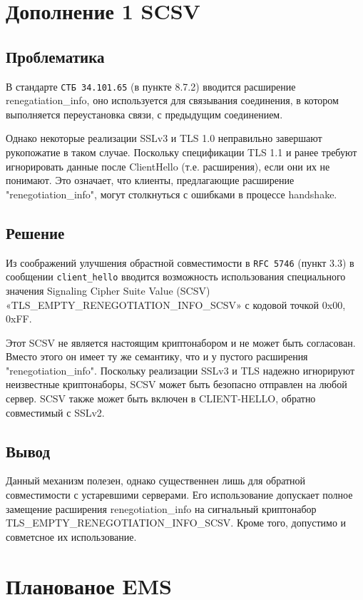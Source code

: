 \section{Дополнение 1 SCSV}
\subsection{Проблематика}
В стандарте \texttt{СТБ 34.101.65} (в пункте 8.7.2) вводится расширение renegatiation\_info, оно используется для связывания соединения, в котором выполняется переустановка связи, с предыдущим соединением.

 Однако некоторые реализации SSLv3 и TLS 1.0 неправильно завершают рукопожатие в таком случае. Поскольку спецификации TLS 1.1 и ранее требуют игнорировать данные после ClientHello (т.е. расширения), если они их не понимают. Это означает, что клиенты, предлагающие расширение "renegotiation\_info",  могут столкнуться с ошибками в процессе handshake. 
  
\subsection{Решение}
  Из соображений улучшения обрастной совместимости в \texttt{RFC 5746} (пункт 3.3) в сообщении \texttt{client\_hello}  вводится возможность использования специального значения Signaling Cipher Suite Value (SCSV) «TLS\_EMPTY\_RENEGOTIATION\_INFO\_SCSV» с кодовой точкой {0x00, 0xFF}.
 
Этот SCSV не является настоящим криптонабором и не может быть согласован. Вместо этого он имеет ту же семантику, что и у пустого расширения "renegotiation\_info". 
Поскольку реализации SSLv3 и TLS надежно игнорируют неизвестные криптонаборы, SCSV может
быть безопасно отправлен на любой сервер. SCSV также может быть включен в
CLIENT-HELLO, обратно совместимый с SSLv2.

\subsection{Вывод}
Данный механизм полезен, однако существеннен лишь для обратной совместимости с устаревшими серверами. Его использование допускает полное замещение расширения renegotiation\_info на сигнальный криптонабор TLS\_EMPTY\_RENEGOTIATION\_INFO\_SCSV. Кроме того, допустимо и совметсное их использование.




\section{Планованое EMS}

